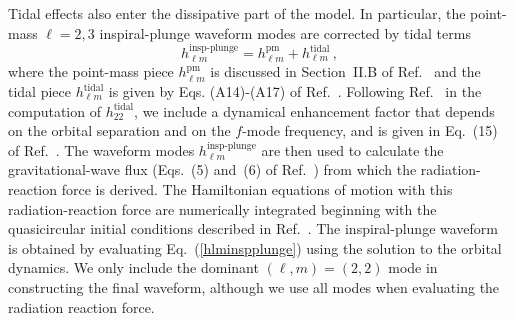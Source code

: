 \documentclass[prd,aps,letter,twocolumn,floatfix,notitlepage,nofootinbib]{revtex4-1}
\begin{document}
Tidal effects also enter the dissipative part of the model. In particular, the point-mass $\ell=2,3$ inspiral-plunge waveform modes are corrected by tidal terms
\begin{equation}
h_{\ell m}^{\textrm{insp-plunge}} = h_{\ell m}^{\textrm{pm}} + h_{\ell m}^{\textrm{tidal}}\,,\label{hlminspplunge}
\end{equation} 
where the point-mass piece $h_{\ell m}^{\textrm{pm}}$ is discussed in Section~II.B of Ref.~\cite{Bohe:2016gbl} and the tidal piece $h_{\ell m}^{\textrm{tidal}}$ is given by Eqs. (A14)-(A17) of Ref.~\cite{Damour:2012yf}. Following Ref.~\cite{Dietrich:2017feu} in the computation of $h_{22}^{\textrm{tidal}}$, we include a dynamical enhancement factor that depends on the orbital separation and on the $f$-mode frequency, and is given in Eq.~(15) of Ref.~\cite{Dietrich:2017feu}. The waveform modes $h_{\ell m}^{\textrm{insp-plunge}}$ are then used to calculate the gravitational-wave flux (Eqs.~(5) and~(6) of Ref.~\cite{Dietrich:2017feu}) from which the radiation-reaction force is derived. The Hamiltonian equations of motion with this radiation-reaction force are numerically integrated beginning with the quasicircular initial conditions described in Ref.~\cite{Buonanno:2005xu}. The inspiral-plunge waveform is obtained by evaluating Eq.~(\ref{hlminspplunge}) using the solution to the orbital dynamics. We only include the dominant $(\ell,m)=(2,2)$ mode in constructing the final waveform, although we use all modes when evaluating the radiation reaction force.

\end{document}
